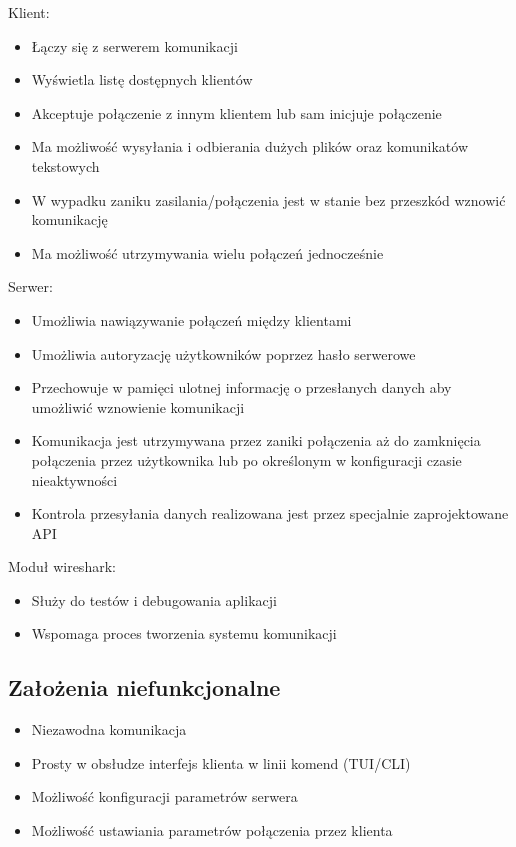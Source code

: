 \documentclass{article}
\begin{document}
Klient:
\begin{itemize}
\item Łączy się z serwerem komunikacji
\item Wyświetla listę dostępnych klientów
\item Akceptuje połączenie z innym klientem lub sam inicjuje połączenie
\item Ma możliwość wysyłania i odbierania dużych plików oraz komunikatów tekstowych
\item W wypadku zaniku zasilania/połączenia jest w stanie bez przeszkód wznowić komunikację
\item Ma możliwość utrzymywania wielu połączeń jednocześnie
\end{itemize}
Serwer:
\begin{itemize}
\item Umożliwia nawiązywanie połączeń między klientami
\item Umożliwia autoryzację użytkowników poprzez hasło serwerowe
\item Przechowuje w pamięci ulotnej informację o przesłanych danych aby umożliwić wznowienie komunikacji
\item Komunikacja jest utrzymywana przez zaniki połączenia aż do zamknięcia połączenia przez użytkownika lub po określonym w konfiguracji czasie nieaktywności
\item Kontrola przesyłania danych realizowana jest przez specjalnie zaprojektowane API
\end{itemize}
Moduł wireshark:
\begin{itemize}
\item Służy do testów i debugowania aplikacji
\item Wspomaga proces tworzenia systemu komunikacji
\end{itemize}

\subsection{Założenia niefunkcjonalne}

\begin{itemize}
\item Niezawodna komunikacja
\item Prosty w obsłudze interfejs klienta w linii komend (TUI/CLI)
\item Możliwość konfiguracji parametrów serwera
\item Możliwość ustawiania parametrów połączenia przez klienta
\end{itemize}
\end{document}
